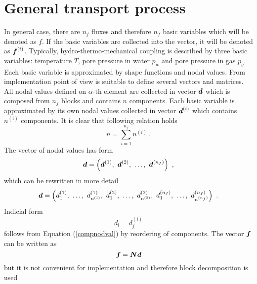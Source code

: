 \documentclass[12pt]{book}
\newcommand{\mbf}[1]{\mbox{\boldmath$#1$}}
\begin{document}
\section{General transport process}
In general case, there are $n_f$ fluxes and therefore $n_f$ basic variables which will be denoted as $f$.
If the basic variables are collected into the vector, it will be denoted as $\mbf{f}^{(i)}$.
Typically, hydro-thermo-mechanical coupling is described by three basic variables:
temperature $T$, pore pressure in water $p_w$ and pore pressure in gas $p_g$.
Each basic variable is approximated by shape functions and nodal values. From implementation point of
view is suitable to define several vectors and matrices. All nodal values defined on $\alpha$-th element
are collected in vector $\mbf{d}$ which is composed from $n_f$ blocks and contains $n$ components. Each basic variable is
approximated by its own nodal values collected in vector $\mbf{d}^{(i)}$ which contains $n^{(i)}$ components.
It is clear that following relation holds
\begin{equation}
n = \sum_{i=1}^{n_f} n^{(i)}\ .
\end{equation}
The vector of nodal values has form
\begin{equation}\label{defnodval}
\mbf{d} = \left(\mbf{d}^{(1)},\ \mbf{d}^{(2)},\ \ldots,\ \mbf{d}^{(n_f)}\right)\ ,
\end{equation}
which can be rewritten in more detail
\begin{equation}\label{compnodval}
\mbf{d} = \left(d^{(1)}_1,\ \ldots,\ d^{(1)}_{n^{(1)}},\ d^{(2)}_1,\ \ldots,\ d^{(2)}_{n^{(2)}},\
d^{(n_f)}_1,\ \ldots,\ d^{(n_f)}_{n^{(n_f)}}\right)\ .
\end{equation}
Indicial form
\begin{equation}\label{indcompnodval}
d_l = d_j^{(i)}
\end{equation}
follows from Equation (\ref{compnodval}) by reordering of components.
The vector $\mbf{f}$ can be written as
\begin{equation}
\mbf{f} = \mbf{N} \mbf{d}
\end{equation}
but it is not convenient for implementation and therefore block decomposition is used
\end{document}
